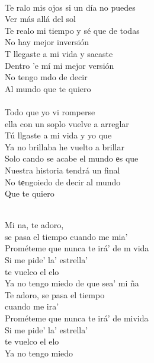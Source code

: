 \begin{cancion}[Te Regalo][Rels B]%
	     \\
	Te ralo mis ojos si un día no puedes\\
Ver más allá del sol\\
	Te realo mi tiempo y sé que de todas\\
No hay mejor inversión\\
	T llegaste a mi vida y sacaste \\
Dentro 'e mí mi mejor versión\\
	No tengo mdo de decir\\
Al mundo que te quiero\\
\jump\\
	Todo  que yo vi romperse\\
ella con un soplo vuelve a arreglar\\
	Tú llgaste a mi vida y yo que\\
Ya no brillaba he vuelto a brillar\\
	Solo cando se acabe el mundo еs que\\
Nuestra historia tendrá un final\\
	No tеngoiedo de decir al mundo\\
Que te quiero\\\jump\\
	\begin{chorus}%
	Mi na, te adoro,  \\
	se pasa el tiempo cuando me mia’\\
	Prométeme que nunca te irá' de m vida\\
Si me pide' la’ estrella' \\
	te vuelco el elo\\
	Ya no tengo miedo de que sea' mi ña\\
Te adoro, se pasa el tiempo \\
	cuando me ira'\\
	Prométeme que nunca te irá' de mivida\\
Si me pide' la' estrella' \\
	te vuelco el elo\\
Ya no tengo miedo\\
	\end{chorus}%

\end{cancion}
